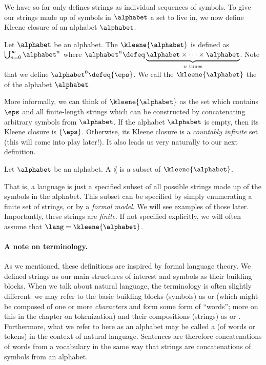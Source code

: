 We have so far only defines strings as individual sequences of symbols.
To give our strings made up of symbols in $\alphabet$ a set to live in, we now define Kleene closure of an alphabet $\alphabet$.
\begin{definition}
Let $\alphabet$ be an alphabet.
The  $\kleene{\alphabet}$ is defined as $\bigcup_{n=0}^\infty \alphabet^n$ where $\alphabet^n \defeq \underbrace{\alphabet \times \cdots \times \alphabet}_{n \text{ times}}$. 
Note that we define $\alphabet^0 \defeq \{\eps\}$.
We call the $\kleene{\alphabet}$ the  of the alphabet $\alphabet$.
\end{definition}
More informally, we can think of $\kleene{\alphabet}$ as the set which contains $\eps$ and all finite-length strings which can be constructed by concatenating arbitrary symbols from $\alphabet$. 
If the alphabet $\alphabet$ is empty, then its Kleene closure is $\left\{ \eps \right\}$. 
Otherwise, its Kleene closure is a \emph{countably infinite} set (this will come into play later!). 
It also leads us very naturally to our next definition.
\begin{definition}
Let $\alphabet$ be an alphabet. 
A  $\lang$ is a subset of $\kleene{\alphabet}$.
\end{definition}
That is, a language is just a specified subset of all possible strings made up of the symbols in the alphabet.
This subset can be specified by simply enumerating a finite set of strings, or by a \emph{formal model}.
We will see examples of those later.
Importantly, these strings are \emph{finite}.
If not specified explicitly, we will often assume that $\lang = \kleene{\alphabet}$.

\paragraph{A note on terminology.} 
As we mentioned, these definitions are inspired by formal language theory.
We defined strings as our main structures of interest and symbols as their building blocks.
When we talk about natural language, the terminology is often slightly different: we may refer to the basic building blocks (symbols) as  or  (which might be composed of one or more \emph{characters} and form some form of ``words''; more on this in the chapter on tokenization) and their compositions (strings) as  or .
Furthermore, what we refer to here as an alphabet may be called a  (of words or tokens) in the context of natural language.
Sentences are therefore concatenations of words from a vocabulary in the same way that strings are concatenations of symbols from an alphabet.

